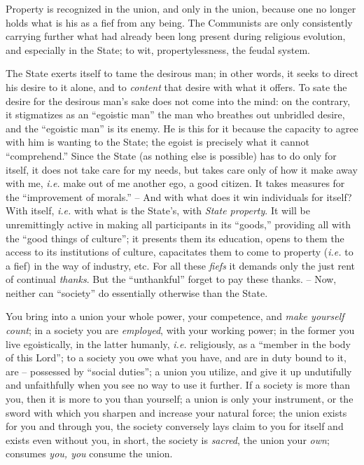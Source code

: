 \documentclass[12pt,a4paper]{book}
\begin{document}
Property is recognized in the union, and only in the union, because one no 
longer holds what is his as a fief from any being. The Communists are only 
consistently carrying further what had already been long present during 
religious evolution, and especially in the State; to wit, propertylessness, 
the feudal system.

The State exerts itself to tame the desirous man; in other words, it seeks to 
direct his desire to it alone, and to \textit{content} that desire with what 
it offers. To sate the desire for the desirous man's sake does not come into 
the mind: on the contrary, it stigmatizes as an ``egoistic man'' the man who 
breathes out unbridled desire, and the ``egoistic man'' is its enemy. He is 
this for it because the capacity to agree with him is wanting to the State; 
the egoist is precisely what it cannot ``comprehend.'' Since the State (as 
nothing else is possible) has to do only for itself, it does not take care for 
my needs, but takes care only of how it make away with me, \textit{i.e.} make 
out of me another ego, a good citizen. It takes measures for the 
``improvement of morals.'' -- And with what does it win individuals for 
itself? With itself, \textit{i.e.} with what is the State's, with 
\textit{State property}. It will be unremittingly active in making all 
participants in its ``goods,'' providing all with the ``good things of 
culture''; it presents them its education, opens to them the access to its 
institutions of culture, capacitates them to come to property (\textit{i.e.} 
to a fief) in the way of industry, etc. For all these \textit{fiefs} it 
demands only the just rent of continual \textit{thanks}. But the 
``unthankful'' forget to pay these thanks. -- Now, neither can ``society'' 
do essentially otherwise than the State.

You bring into a union your whole power, your competence, and \textit{make 
yourself count}; in a society you are \textit{employed}, with your working 
power; in the former you live egoistically, in the latter humanly, 
\textit{i.e.} religiously, as a ``member in the body of this Lord''; to a 
society you owe what you have, and are in duty bound to it, are -- possessed 
by ``social duties''; a union you utilize, and give it up undutifully and 
unfaithfully when you see no way to use it further. If a society is more than 
you, then it is more to you than yourself; a union is only your instrument, or 
the sword with which you sharpen and increase your natural force; the union 
exists for you and through you, the society conversely lays claim to you for 
itself and exists even without you, in short, the society is \textit{sacred}, 
the union your \textit{own}; consumes \textit{you, you} consume the union.
\end{document}
